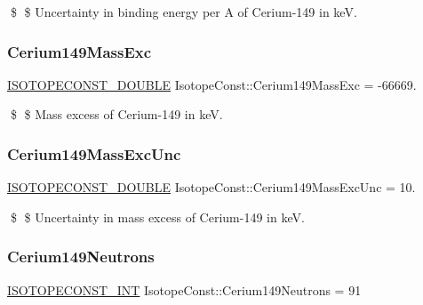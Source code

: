 \$ \$ Uncertainty in binding energy per A of Cerium-\/149 in keV. \mbox{\label{group___isotope_const-_cerium-_ce149_ga16a5f68b82759f50b6ac1dc398a312e3}} 
\subsubsection{\texorpdfstring{Cerium149\+Mass\+Exc}{Cerium149MassExc}}
{\footnotesize\ttfamily \mbox{\hyperlink{group___isotope_const-_macros_ga8f45a7272ce02c0b4c65c44636ed719a}{I\+S\+O\+T\+O\+P\+E\+C\+O\+N\+S\+T\+\_\+\+D\+O\+U\+B\+LE}} Isotope\+Const\+::\+Cerium149\+Mass\+Exc = -\/66669.}

\$ \$ Mass excess of Cerium-\/149 in keV. \mbox{\label{group___isotope_const-_cerium-_ce149_ga13bcd4e91073f84c9ce2d20daed44787}} 
\subsubsection{\texorpdfstring{Cerium149\+Mass\+Exc\+Unc}{Cerium149MassExcUnc}}
{\footnotesize\ttfamily \mbox{\hyperlink{group___isotope_const-_macros_ga8f45a7272ce02c0b4c65c44636ed719a}{I\+S\+O\+T\+O\+P\+E\+C\+O\+N\+S\+T\+\_\+\+D\+O\+U\+B\+LE}} Isotope\+Const\+::\+Cerium149\+Mass\+Exc\+Unc = 10.}

\$ \$ Uncertainty in mass excess of Cerium-\/149 in keV. \mbox{\label{group___isotope_const-_cerium-_ce149_gab059391c3939bad3a83262f7a5358b9a}} 
\subsubsection{\texorpdfstring{Cerium149\+Neutrons}{Cerium149Neutrons}}
{\footnotesize\ttfamily \mbox{\hyperlink{group___isotope_const-_macros_ga5f18360b3e99483a35c32d789e62621c}{I\+S\+O\+T\+O\+P\+E\+C\+O\+N\+S\+T\+\_\+\+I\+NT}} Isotope\+Const\+::\+Cerium149\+Neutrons = 91}

